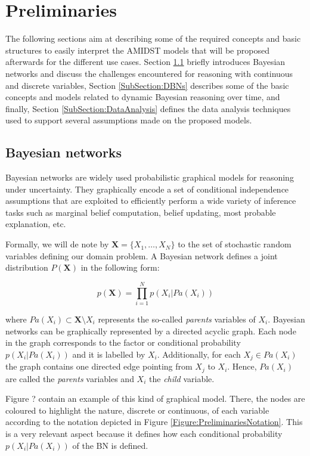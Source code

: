 \section{Preliminaries}\label{Section:Preliminaries}

The following sections aim at describing some of the required concepts and basic structures to easily interpret the AMIDST models that will be proposed afterwards for the different use cases. Section \ref{SubSection:HybridBNs} briefly introduces Bayesian networks and discuss the challenges encountered for reasoning with continuous and discrete variables, Section \ref{SubSection:DBNs} describes some of the basic concepts and models related to dynamic Bayesian reasoning over time, and finally, Section \ref{SubSection:DataAnalysis} defines the data analysis techniques used to support several assumptions made on the proposed models.

\subsection{Bayesian networks}\label{SubSection:HybridBNs}

Bayesian networks \cite{JensenNielsen2007} are widely used probabilistic graphical models for reasoning under uncertainty. They graphically encode a set of conditional independence assumptions that are exploited to efficiently perform a wide variety of inference tasks such as marginal belief computation, belief updating, most probable explanation, etc.  

Formally, we will de note by $\bm X = \{X_1,\ldots,X_N\}$ to the set of stochastic random variables defining our domain problem. A Bayesian network defines a joint distribution $P(\bm X)$ in the following form:

$$ p(\bm X) = \prod_{i=1}^N p(X_i|Pa(X_i))$$ 

\noindent where $Pa(X_i)\subset \bm X\setminus X_i$ represents the so-called \emph{parents} variables of $X_i$. Bayesian networks can be graphically represented by a directed acyclic graph. Each node in the graph corresponds to the factor or conditional probability $p(X_i|Pa(X_i))$  and it is labelled by $X_i$. Additionally, for each $X_j\in Pa(X_i)$ the graph contains one directed edge pointing from $X_j$ to $X_i$. Hence, $Pa(X_i)$ are called the \emph{parents} variables and $X_i$ the \emph{child} variable. 

Figure ? contain an example of this kind of graphical model. There, the nodes are coloured to highlight the nature, discrete or continuous, of each variable according to the notation depicted in Figure \ref{Figure:PreliminariesNotation}. This is a very relevant aspect because it defines how each conditional probability $p(X_i|Pa(X_i))$ of the BN is defined. 

